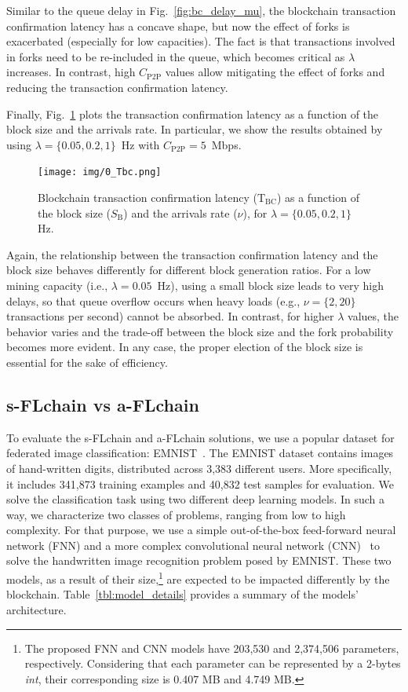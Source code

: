 \documentclass[lettersize,journal]{IEEEtran}
\begin{document}
Similar to the queue delay in Fig.~\ref{fig:bc_delay_mu}, the blockchain transaction confirmation latency has a concave shape, but now the effect of forks is exacerbated (especially for low capacities). The fact is that transactions involved in forks need to be re-included in the queue, which becomes critical as $\lambda$ increases. In contrast, high $C_\text{P2P}$ values allow mitigating the effect of forks and reducing the transaction confirmation latency.

Finally, Fig.~\ref{fig:5_delay_vs_block_size} plots the transaction confirmation latency as a function of the block size and the arrivals rate. In particular, we show the results obtained by using $\lambda = \{0.05, 0.2, 1\}$~Hz with $C_\text{P2P} = 5$~Mbps.

\begin{figure}[ht!]
	\centering
	\texttt{[image: img/0\_Tbc.png]}
	\caption{Blockchain transaction confirmation latency ($\text{T}_\text{BC}$) as a function of the block size ($S_\text{B}$) and the arrivals rate ($\nu$), for $\lambda = \{0.05, 0.2, 1\}$ Hz.}
	\label{fig:5_delay_vs_block_size}
\end{figure}

Again, the relationship between the transaction confirmation latency and the block size behaves differently for different block generation ratios. For a low mining capacity (i.e., $\lambda=0.05$~Hz), using a small block size leads to very high delays, so that queue overflow occurs when heavy loads (e.g., $\nu=\{2,20\}$ transactions per second) cannot be absorbed. In contrast, for higher $\lambda$ values, the behavior varies and the trade-off between the block size and the fork probability becomes more evident. In any case, the proper election of the block size is essential for the sake of efficiency.

\subsection{s-FLchain vs a-FLchain}
\label{section:flchain_analysis}

To evaluate the s-FLchain and a-FLchain solutions, we use a popular dataset for federated image classification: \mbox{EMNIST}~\cite{cohen_afshar_tapson_schaik_2017}. The EMNIST dataset contains images of hand-written digits, distributed across 3,383 different users. More specifically, it includes 341,873 training examples and 40,832 test samples for evaluation. We solve the classification task using two different deep learning models. In such a way, we characterize two classes of problems, ranging from low to high complexity. For that purpose, we use a simple out-of-the-box feed-forward neural network (FNN) and a more complex convolutional neural network (CNN)~\cite{he2016deep} to solve the handwritten image recognition problem posed by EMNIST. These two models, as a result of their size,\footnote{The proposed FNN and CNN models have 203,530 and 2,374,506 parameters, respectively. Considering that each parameter can be represented by a 2-bytes \textit{int}, their corresponding size is 0.407 MB and 4.749 MB.} are expected to be impacted differently by the blockchain. Table~\ref{tbl:model_details} provides a summary of the models' architecture.
\end{document}
